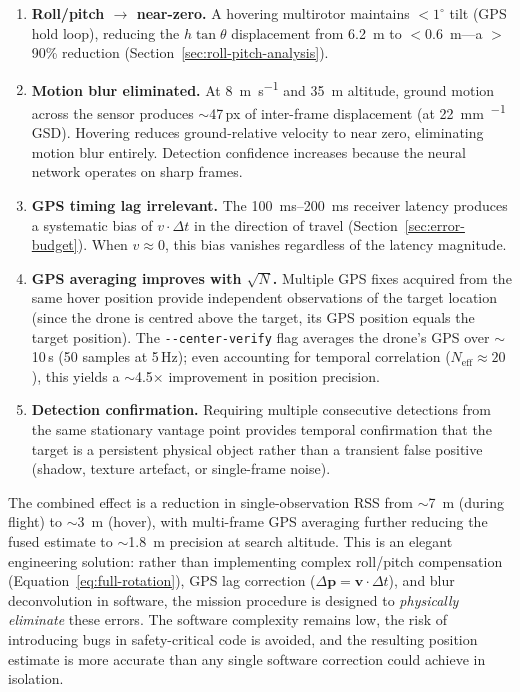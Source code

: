 \begin{enumerate}
  \item \textbf{Roll/pitch $\to$ near-zero.}  A hovering multirotor maintains $<1^{\circ}$ tilt (GPS hold loop), reducing the $h\tan\theta$ displacement from \SI{6.2}{\metre} to $<$\SI{0.6}{\metre}---a $>$90\% reduction (Section~\ref{sec:roll-pitch-analysis}).

  \item \textbf{Motion blur eliminated.}  At \SI{8}{\metre\per\second} and \SI{35}{\metre} altitude, ground motion across the sensor produces $\sim$47\,px of inter-frame displacement (at \SI{22}{\milli\metre\per\px} GSD).  Hovering reduces ground-relative velocity to near zero, eliminating motion blur entirely.  Detection confidence increases because the neural network operates on sharp frames.

  \item \textbf{GPS timing lag irrelevant.}  The \SIrange{100}{200}{\milli\second} receiver latency produces a systematic bias of $v \cdot \Delta t$ in the direction of travel (Section~\ref{sec:error-budget}).  When $v \approx 0$, this bias vanishes regardless of the latency magnitude.

  \item \textbf{GPS averaging improves with $\sqrt{N}$.}  Multiple GPS fixes acquired from the same hover position provide independent observations of the target location (since the drone is centred above the target, its GPS position equals the target position).  The \texttt{-{}-center-verify} flag averages the drone's GPS over $\sim$10\,s (50 samples at 5\,Hz); even accounting for temporal correlation ($N_\mathrm{eff} \approx 20$), this yields a $\sim$4.5$\times$ improvement in position precision.

  \item \textbf{Detection confirmation.}  Requiring multiple consecutive detections from the same stationary vantage point provides temporal confirmation that the target is a persistent physical object rather than a transient false positive (shadow, texture artefact, or single-frame noise).
\end{enumerate}

\noindent The combined effect is a reduction in single-observation RSS from $\sim$\SI{7}{\metre} (during flight) to $\sim$\SI{3}{\metre} (hover), with multi-frame GPS averaging further reducing the fused estimate to $\sim$\SI{1.8}{\metre} precision at search altitude.  This is an elegant engineering solution: rather than implementing complex roll/pitch compensation (Equation~\ref{eq:full-rotation}), GPS lag correction ($\Delta\mathbf{p} = \mathbf{v} \cdot \Delta t$), and blur deconvolution in software, the mission procedure is designed to \emph{physically eliminate} these errors.  The software complexity remains low, the risk of introducing bugs in safety-critical code is avoided, and the resulting position estimate is more accurate than any single software correction could achieve in isolation.

